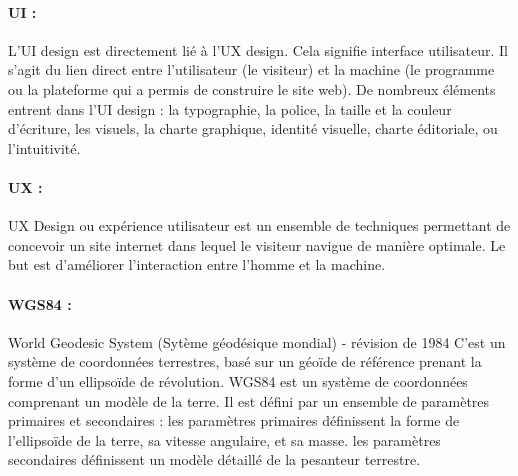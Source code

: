 \paragraph{UI :}
L’UI design est directement lié à l’UX design. Cela signifie interface 
utilisateur. Il s’agit du lien direct entre l’utilisateur (le visiteur) 
et la machine (le programme ou la plateforme qui a permis de construire 
le site web). De nombreux éléments entrent dans l’UI design : la typographie, la police, la taille et la 
couleur d’écriture, les visuels, la charte graphique, identité visuelle, 
charte éditoriale, ou l’intuitivité.

\paragraph{UX :}
UX Design ou expérience utilisateur est un ensemble de techniques 
permettant de concevoir un site internet dans lequel le visiteur navigue 
de manière optimale. Le but est d’améliorer l’interaction entre l’homme 
et la machine. 

\paragraph{WGS84 :}
World Geodesic System (Sytème géodésique mondial) - révision de 1984
C'est un système de coordonnées terrestres, basé sur un géoïde de référence 
prenant la forme d'un ellipsoïde de révolution.
WGS84 est un système de coordonnées comprenant un modèle de la terre. Il est 
défini par un ensemble de paramètres primaires et secondaires :
les paramètres primaires définissent la forme de l'ellipsoïde de la terre, sa vitesse angulaire, et sa masse.
les paramètres secondaires définissent un modèle détaillé de la pesanteur terrestre.
